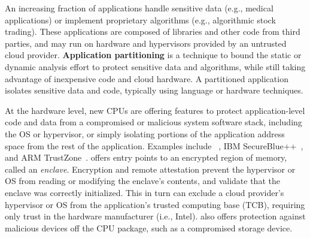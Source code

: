

An increasing fraction of applications handle sensitive data (e.g., medical applications)
or implement proprietary algorithms (e.g., algorithmic stock trading).
These applications are composed of 
libraries and other code from third parties, and may run on 
hardware and hypervisors provided by an untrusted cloud provider.
{\bf Application partitioning} is a technique to 
bound the 
static or dynamic analysis effort to protect sensitive data and algorithms,
while still taking advantage of inexpensive code and cloud hardware.
A partitioned application isolates sensitive data and code, typically using
language or hardware techniques.


At the hardware level, 
new CPUs are offering features to protect application-level code and data
from a  compromised or malicious system software stack,
including the OS or hypervisor, or simply isolating portions of the 
application address space from the rest of the application.
Examples include \intel{} \sgx{}~\citep{sgx-manual}, 
IBM SecureBlue++~\citep{secureblue++}, and ARM TrustZone~\citep{trustzone}.
\sgx{} offers %
entry points to an encrypted region of memory, called an {\em enclave}.
Encryption and remote attestation 
prevent the hypervisor or OS from reading or modifying the enclave's contents,
and validate that the enclave was correctly initialized.
This in turn
can exclude 
a cloud provider's hypervisor or OS from the application's trusted computing base (TCB),
requiring only trust in the hardware manufacturer (i.e., Intel).
\sgx{} also offers protection against malicious devices off the CPU package,
such as a compromised storage device.

